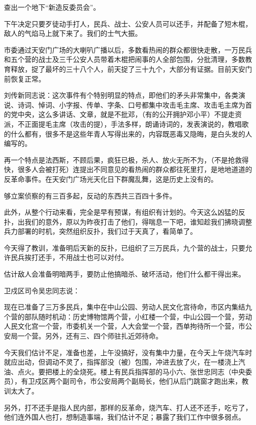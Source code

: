 \begin{maonote}
查出一个地下“新造反委员会”。

下午决定只要歹徒动手打人，民兵、战士、公安人员可以还手，并配备了短木棍，敌人的气焰马上就下来了。我们的士气大振。

市委通过天安门广场的大喇叭广播以后，多数看热闹的群众都很快走散，一万民兵和五个营的战士及三千公安人员带着木棍把闹事的人全部包围，分批清理，多数教育释放，捉了最坏的三十八个人，前天捉了三十九个，大部分有证据。目前天安门前恢复正常。

刘传新同志说：这次事件有个特别明显的特点，即他们的矛头非常集中，各类演说、诗词、悼词、小字报、传单、字条、口号都集中攻击毛主席、攻击毛主席为首的党中央，这么多讲话、文章，就是不批邓，（有的公开拥护邓小平）不提走资派，不正面提毛主席（攻击的提），手法多样，朗诵诗词的，发表演说的，教唱歌的什么都有，很多不是这些年青人写得出来的，内容既恶毒又隐晦，是白头发的人编写的。

再一个特点是法西斯，不顾后果，疯狂已极，杀人、放火无所不为，（不是抢救得快，很多人会被打死）连提出不同意见的看热闹的群众都往死里打，是地地道道的反革命事件。在天安门广场光天化日下群魔乱舞，这是历史上没有的。

够立案侦察的有三百多起，反动的东西共三百四十多件。

此外，从整个行动来看，完全是早有预谋，有组织有计划的。今天这么凶猛的反扑，出我们的意外，原以为昨夜打击了他们，得喘息一下吧，谁知趁我们拂晓调整兵力部署的时机，突然组织反扑，我们过于天真了，看简单了。

今天得了教训，准备明后天新的反扑，已组织了三万民兵，九个营的战士，只要允许民兵挨打还手，不用战士也可以对付。

估计敌人会准备明暗两手，要防止他搞暗杀、破坏活动，他们什么都干得出来。

卫戍区司令吴忠同志说：

现在已准备了三万多民兵，集中在中山公园、劳动人民文化宫待命，市区内集结九个营的部队随时机动：历史博物馆两个营，小红楼一个营，中山公园一个营，劳动人民文化宫一个营，市委机关一个营，人大会堂一个营，西单拘待所一个营，市公安局一个营。另外，还有三、四个师驻扎近郊待命。

今天我们估计不足，准备也差，上午没搞好，没有集中力量，在今天上午烧汽车时就应出动，但调动不灵了，指挥部没（被）包围，冲进去放了火，在一楼浇上汽油、点火。要把楼上的全烧死。楼上有民兵指挥部的马小六、张世忠同志（中央委员），有卫戍区两个副司令，市公安局两个副局长，他们从后门跳窗才跑出来，教训太大了。

另外，打不还手是指人民内部，那样的反革命，烧汽车、打人还不还手，吃亏了，他们连外国人也打，想制造事端，我们估计不足；暴露了我们工作中很多弱点。


\end{maonote}
